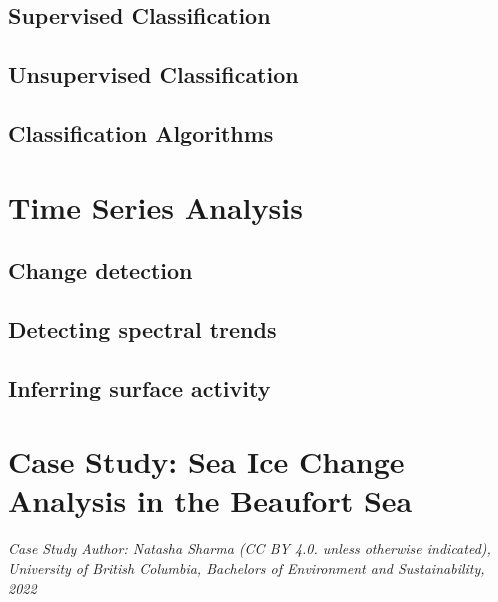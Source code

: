 \documentclass[
]{book}
\begin{document}
\hypertarget{supervised-classification}{%
\subsection{Supervised Classification}\label{supervised-classification}}

\hypertarget{unsupervised-classification}{%
\subsection{Unsupervised Classification}\label{unsupervised-classification}}

\hypertarget{classification-algorithms}{%
\subsection{Classification Algorithms}\label{classification-algorithms}}

\hypertarget{time-series-analysis}{%
\section{Time Series Analysis}\label{time-series-analysis}}

\hypertarget{change-detection}{%
\subsection{Change detection}\label{change-detection}}

\hypertarget{detecting-spectral-trends}{%
\subsection{Detecting spectral trends}\label{detecting-spectral-trends}}

\hypertarget{inferring-surface-activity}{%
\subsection{Inferring surface activity}\label{inferring-surface-activity}}

\hypertarget{case-study-sea-ice-change-analysis-in-the-beaufort-sea}{%
\section{Case Study: Sea Ice Change Analysis in the Beaufort Sea}\label{case-study-sea-ice-change-analysis-in-the-beaufort-sea}}

\emph{Case Study Author: Natasha Sharma (CC BY 4.0. unless otherwise indicated), University of British Columbia, Bachelors of Environment and Sustainability, 2022}
\end{document}
